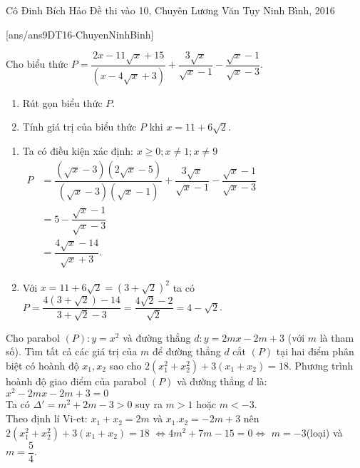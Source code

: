 \begin{name}
{Cô Đinh Bích Hảo}
{Đề thi vào 10, Chuyên Lương Văn Tụy Ninh Bình, 2016}
\end{name}
\setcounter{ex}{0}
[ans/ans9DT16-ChuyenNinhBinh]
\begin{ex}%
Cho biểu thức $P=\dfrac{2x-11\sqrt{x}+15}{(x-4\sqrt{x}+3)}+\dfrac{3\sqrt{x}}{\sqrt{x}-1}-\dfrac{\sqrt{x}-1}{\sqrt{x}-3}$.
    \begin{enumerate}    
        \item Rút gọn biểu thức $P$.
        \item Tính giá trị của biểu thức  $P$ khi $x=11+6\sqrt{2}$.
    \end{enumerate}
  
\loigiai
    {
    \begin{enumerate}
        \item Ta có điều kiện xác định: $x \geq 0; x\ne 1; x\ne 9$ \\
        $
        \begin{aligned}
        P&=\dfrac{\left(\sqrt{x}-3\right)\left(2\sqrt{x}-5\right)}{\left(\sqrt{x}-3\right)\left(\sqrt{x}-1\right)}+\dfrac{3\sqrt{x}}{\sqrt{x}-1}-\dfrac{\sqrt{x}-1}{\sqrt{x}-3}\\
        &=5-\dfrac{\sqrt{x}-1}{\sqrt{x}-3}\\
        &=\dfrac{4\sqrt{x}-14}{\sqrt{x}+3}.
        \end{aligned}
        $
        \item Với $x=11+6\sqrt{2}=(3+\sqrt{2})^2$ ta có\\
        $P=\dfrac{4(3+\sqrt{2})-14}{3+\sqrt{2}-3}=\dfrac{4\sqrt{2}-2}{\sqrt{2}}=4-\sqrt{2}$.\\
    \end{enumerate}
    }
\end{ex}

\begin{ex}%
Cho parabol $(P): y=x^2$ và đường thẳng $d: y=2mx-2m+3$ (với $m$ là tham số). Tìm tất cả các giá trị của $m$ để đường thẳng $d$ cắt $(P)$ tại hai điểm phân biệt có hoành độ $x_1,x_2$ sao cho $2(x_1^2+x_2^2)+3(x_1+x_2)=18$.
\loigiai
    {
   Phương trình hoành độ giao điểm của parabol $(P)$ và đường thẳng $d$ là: $x^2-2mx-2m+3=0$\\
   Ta có $\Delta'=m^2+2m-3>0$ suy ra $m>1$ hoặc $m<-3$.\\
    Theo định lí Vi-et: $x_1+x_2=2m$ và $x_1.x_2=-2m+3$ nên $2(x_1^2+x_2^2)+3(x_1+x_2)=18$ $\Leftrightarrow 4m^2+7m-15=0 \Leftrightarrow $ $m=-3$(loại) và $m=\dfrac{5}{4}$.\\
    }
\end{ex}

